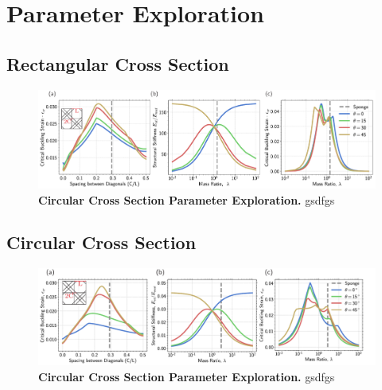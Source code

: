 \documentclass[10pt,twoside]{fernandes_supp}
\begin{document}
\section{Parameter Exploration}


\subsection{Rectangular Cross Section}
\begin{figure}[H]
	\centering
	\includegraphics[width=0.9\linewidth]{SFig8.pdf}
	\caption{{\bf Circular Cross Section Parameter Exploration.} gsdfgs}
	\label{SquareCrossSectionParameter}
\end{figure}

\subsection{Circular Cross Section}
\begin{figure}[H]
	\centering
	\includegraphics[width=0.9\linewidth]{SFig9.pdf}
	\caption{{\bf Circular Cross Section Parameter Exploration.} gsdfgs}
	\label{CircularCrossSectionParameter}
\end{figure}
\end{document}
